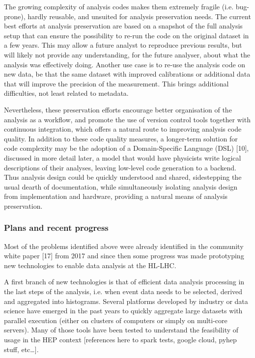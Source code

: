 \documentclass[11pt,a4paper]{article}
\begin{document}
The growing complexity of analysis codes makes them extremely fragile
(i.e. bug-prone), hardly reusable, and unsuited for analysis
preservation needs. The current best efforts at analysis preservation
are based on a snapshot of the full analysis setup that can ensure the
possibility to re-run the code on the original dataset in a few years.
This may allow a future analyst to reproduce previous results, but will
likely not provide any understanding, for the future analyser, about
what the analysis was effectively doing. Another use case is to re-use
the analysis code on new data, be that the same dataset with improved
calibrations or additional data that will improve the precision of the
measurement. This brings additional difficulties, not least related to
metadata.

Nevertheless, these preservation efforts encourage better organisation
of the analysis as a workflow, and promote the use of version control
tools together with continuous integration, which offers a natural route
to improving analysis code quality. In addition to these code quality
measures, a longer-term solution for code complexity may be the adoption
of a Domain-Specific Language (DSL) {[}10{]}, discussed in more detail
later, a model that would have physicists write logical descriptions of
their analyses, leaving low-level code generation to a backend. Thus
analysis design could be quickly understood and shared, sidestepping the
usual dearth of documentation, while simultaneously isolating analysis
design from implementation and hardware, providing a natural means of
analysis preservation.

\hypertarget{plans-and-recent-progress}{%
\subsubsection{Plans and recent
progress}\label{plans-and-recent-progress}}

Most of the problems identified above were already identified in the
community white paper {[}17{]} from 2017 and since then some progress
was made prototyping new technologies to enable data analysis at the
HL-LHC.

A first branch of new technologies is that of efficient data analysis
processing in the last steps of the analysis, i.e. when event data needs
to be selected, derived and aggregated into histograms. Several
platforms developed by industry or data science have emerged in the past
years to quickly aggregate large datasets with parallel execution
(either on clusters of computers or simply on multi-core servers). Many
of those tools have been tested to understand the feasibility of usage
in the HEP context {[}references here to spark tests, google cloud,
pyhep stuff, etc\ldots{]}.
\end{document}

